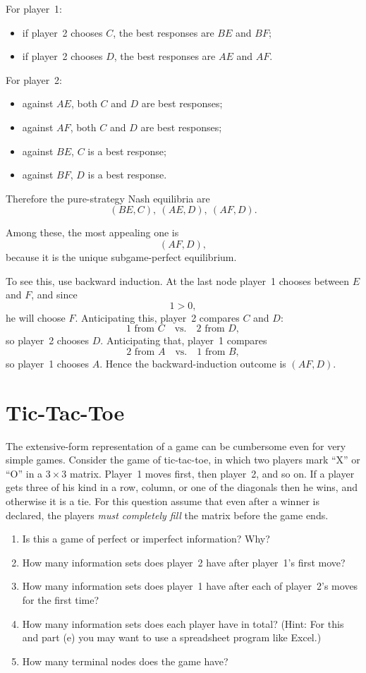 \documentclass[12pt,a4paper]{article}
\begin{document}
\begin{enumerate}[label=\alph*.]
For player~1:
\begin{itemize}
    \item if player~2 chooses $C$, the best responses are $BE$ and $BF$;
    \item if player~2 chooses $D$, the best responses are $AE$ and $AF$.
\end{itemize}

For player~2:
\begin{itemize}
    \item against $AE$, both $C$ and $D$ are best responses;
    \item against $AF$, both $C$ and $D$ are best responses;
    \item against $BE$, $C$ is a best response;
    \item against $BF$, $D$ is a best response.
\end{itemize}

Therefore the pure-strategy Nash equilibria are
\[
\boxed{(BE,C),\ (AE,D),\ (AF,D)}.
\]

Among these, the most appealing one is
\[
\boxed{(AF,D)},
\]
because it is the unique subgame-perfect equilibrium.

To see this, use backward induction. At the last node player~1 chooses between $E$ and $F$, and since
\[
1>0,
\]
he will choose $F$. Anticipating this, player~2 compares $C$ and $D$:
\[
1 \text{ from } C \quad \text{vs.} \quad 2 \text{ from } D,
\]
so player~2 chooses $D$. Anticipating that, player~1 compares
\[
2 \text{ from } A \quad \text{vs.} \quad 1 \text{ from } B,
\]
so player~1 chooses $A$. Hence the backward-induction outcome is $(AF,D)$.

\end{enumerate}

\section{Tic-Tac-Toe}
The extensive-form representation of a game can be cumbersome even for very simple games.
Consider the game of tic-tac-toe, in which two players mark ``X'' or ``O'' in a $3\times 3$ matrix.
Player~1 moves first, then player~2, and so on.
If a player gets three of his kind in a row, column, or one of the diagonals then he wins, and otherwise it is a tie.
For this question assume that even after a winner is declared, the players \emph{must completely fill} the matrix before the game ends.

\begin{enumerate}[label=\alph*.]
    \item Is this a game of perfect or imperfect information? Why?
    \item How many information sets does player~2 have after player~1's first move?
    \item How many information sets does player~1 have after each of player~2's moves for the first time?
    \item How many information sets does each player have in total? (Hint: For this and part (e) you may want to use a spreadsheet program like Excel.)
    \item How many terminal nodes does the game have?
\end{enumerate}
\end{document}
